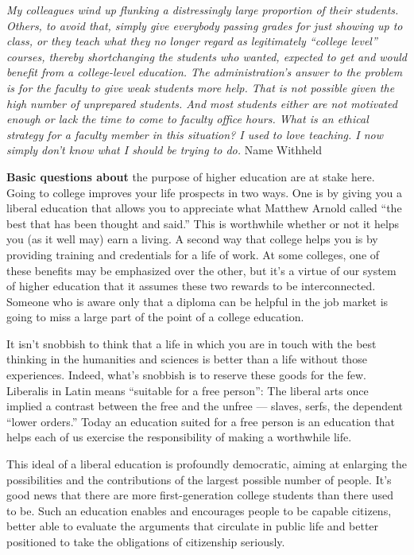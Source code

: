 \emph{My colleagues wind up flunking a distressingly large proportion of
their students. Others, to avoid that, simply give everybody passing
grades for just showing up to class, or they teach what they no longer
regard as legitimately ``college level'' courses, thereby shortchanging
the students who wanted, expected to get and would benefit from a
college-level education. The administration's answer to the problem is
for the faculty to give weak students more help. That is not possible
given the high number of unprepared students. And most students either
are not motivated enough or lack the time to come to faculty office
hours. What is an ethical strategy for a faculty member in this
situation? I used to love teaching. I now simply don't know what I
should be trying to do.} Name Withheld

\textbf{Basic questions about} the purpose of higher education are at
stake here. Going to college improves your life prospects in two ways.
One is by giving you a liberal education that allows you to appreciate
what Matthew Arnold called ``the best that has been thought and said.''
This is worthwhile whether or not it helps you (as it well may) earn a
living. A second way that college helps you is by providing training and
credentials for a life of work. At some colleges, one of these benefits
may be emphasized over the other, but it's a virtue of our system of
higher education that it assumes these two rewards to be interconnected.
Someone who is aware only that a diploma can be helpful in the job
market is going to miss a large part of the point of a college
education.

It isn't snobbish to think that a life in which you are in touch with
the best thinking in the humanities and sciences is better than a life
without those experiences. Indeed, what's snobbish is to reserve these
goods for the few. Liberalis in Latin means ``suitable for a free
person'': The liberal arts once implied a contrast between the free and
the unfree --- slaves, serfs, the dependent ``lower orders.'' Today an
education suited for a free person is an education that helps each of us
exercise the responsibility of making a worthwhile life.

This ideal of a liberal education is profoundly democratic, aiming at
enlarging the possibilities and the contributions of the largest
possible number of people. It's good news that there are more
first-generation college students than there used to be. Such an
education enables and encourages people to be capable citizens, better
able to evaluate the arguments that circulate in public life and better
positioned to take the obligations of citizenship seriously.

